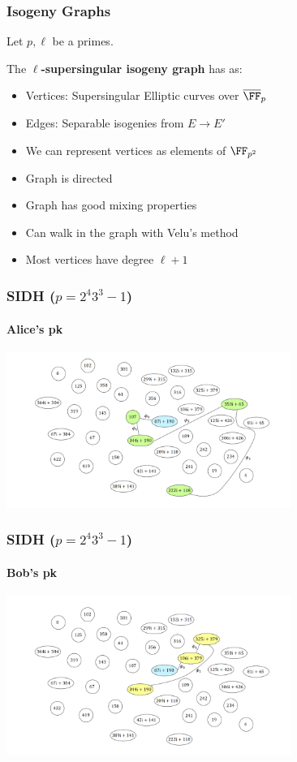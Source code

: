 \documentclass{beamer}
\begin{document}
\begin{frame}
    \frametitle{Isogeny Graphs}
    Let $p, \ell$ be a primes.
    \pause
    \begin{definition}
        The $\ell$\textbf{-supersingular isogeny graph} has as:
        \begin{itemize}
            \item<2-> Vertices: Supersingular Elliptic curves over $\overline{\FF}_p$
            \item<3-> Edges: Separable isogenies from $E \to E'$
        \end{itemize}
    \end{definition}
    \begin{itemize}
        \item<5-> We can represent vertices as elements of $\FF_{p^2}$
        \item<6-> Graph is directed
        \item<7-> Graph has good mixing properties
        \item<8-> Can walk in the graph with Velu's method
        \item<9-> Most vertices have degree $\ell + 1$
    \end{itemize} 

\end{frame}

\begin{frame}
    \frametitle{SIDH ($p = 2^4 3^3 - 1$)}
    \framesubtitle{Alice's pk}
    \begin{center}
        \includegraphics[width=25em]{alice_pk.PNG}
    \end{center}
\end{frame}

\begin{frame}
    \frametitle{SIDH ($p = 2^4 3^3 - 1$)}
    \framesubtitle{Bob's pk}
    \begin{center}
        \includegraphics[width=25em]{bob_pk.PNG}
    \end{center}
\end{frame}
\end{document}
